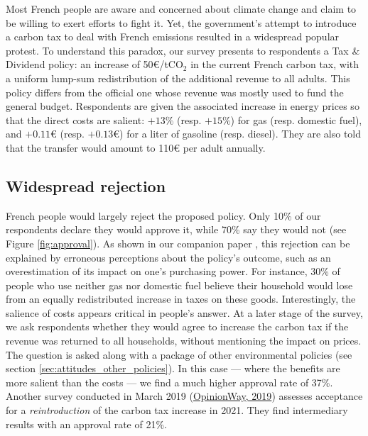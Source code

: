 \documentclass[english,5p,authoryear]{elsarticle}
\begin{document}
Most French people are aware and concerned about climate change and claim to be willing to exert efforts to fight it. Yet, the government's attempt to introduce a carbon tax to deal with French emissions resulted in a widespread popular protest. To understand this paradox, our survey presents to respondents a Tax \& Dividend policy: an increase of 50\euro{}/tCO$_2$ in the current French carbon tax, with a uniform lump-sum redistribution of the additional revenue to all adults. This policy differs from the official one whose revenue was mostly used to fund the general budget. Respondents are given the associated increase in energy prices so that the direct costs are salient: $+13\%$ (resp. $+15\%$) for gas (resp. domestic fuel), and $+0.11$\euro{} (resp. $+0.13$\euro{}) for a liter of gasoline (resp. diesel). They are also told that the transfer would amount to 110\euro{} per adult annually. %

    \subsection{Widespread rejection}

French people would largely reject the proposed policy. Only 10\% of our respondents declare they would approve it, while 70\% say they would not (see Figure \ref{fig:approval}). As shown in our companion paper \citep{douenne_can_2019}, this rejection can be explained by erroneous perceptions about the policy's outcome, such as an overestimation of its impact on one's purchasing power. For instance, 30\% of people who use neither gas nor domestic fuel believe their household would lose from an equally redistributed increase in taxes on these goods. Interestingly, the salience of costs appears critical in people's answer. At a later stage of the survey, we ask respondents whether they would agree to increase the carbon tax if the revenue was returned to all households, without mentioning the impact on prices. The question is asked along with a package of other environmental policies (see section \ref{sec:attitudes_other_policies}). In this case --- where the benefits are more salient than the costs --- we find a much higher approval rate of 37\%. Another survey conducted in March 2019 (\href{https://drive.google.com/file/d/1ne1nUsJJqY1PYFOs9dH9uK6mLw39R1QY/view}{OpinionWay, 2019}) assesses acceptance for a \textit{reintroduction} of the carbon tax increase in 2021. They find intermediary results with an approval rate of 21\%. %
\end{document}
